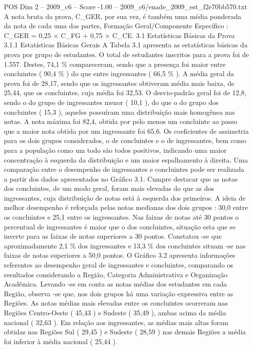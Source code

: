\begin{textsample}{POS Dim 2 – 2009\_c6 – Score -1.00 – 2009\_c6/enade\_2009\_est\_f2e70bb570.txt}
A nota bruta da prova, C\_GER, por sua vez, é também uma média ponderada da nota de cada uma das partes, Formação Geral/Componente Específico : C\_GER = 0,25 × C\_FG + 0,75 × C\_CE. 3.1 Estatísticas Básicas da Prova 3.1.1 Estatísticas Básicas Gerais A Tabela 3.1 apresenta as estatísticas básicas da prova por grupo de estudantes.
O total de estudantes inscritos para a prova foi de 1.557.
Destes, 74,1 \% compareceram, sendo que a presença foi maior entre concluintes ( 90,4 \% ) do que entre ingressantes ( 66,5 \% ).
A média geral da prova foi de 28,17, sendo que os ingressantes obtiveram média mais baixa, de 25,44, que os concluintes, cuja média foi 32,53.
O desvio-padrão geral foi de 12,8, sendo o do grupo de ingressantes menor ( 10,1 ), do que o do grupo dos concluintes ( 15,3 ), aqueles possuíram uma distribuição mais homogênea nas notas.
A nota máxima foi 82,4, obtida por pelo menos um concluinte ao passo que a maior nota obtida por um ingressante foi 65,6.
Os coeficientes de assimetria para os dois grupos considerados, o de concluintes e o de ingressantes, bem como para a população como um todo são todos positivos, indicando uma maior concentração à esquerda da distribuição e um maior espalhamento à direita.
Uma comparação entre o desempenho de ingressantes e concluintes pode ser realizada a partir dos dados apresentados no Gráfico 3.1.
Cumpre destacar que as notas dos concluintes, de um modo geral, foram mais elevadas do que as dos ingressantes, cuja distribuição de notas está à esquerda dos primeiros.
A ideia de melhor desempenho é reforçada pelas notas medianas dos dois grupos : 30,0 entre os concluintes e 25,1 entre os ingressantes.
Nas faixas de notas até 30 pontos o percentual de ingressantes é maior que o dos concluintes, situação esta que se inverte para as faixas de notas superiores a 30 pontos.
Constatou -se que aproximadamente 2,1 \% dos ingressantes e 13,3 \% dos concluintes situam -se nas faixas de notas superiores a 50,0 pontos.
O Gráfico 3.2 apresenta informações referentes ao desempenho geral de ingressantes e concluintes, comparando os resultados considerando a Região, Categoria Administrativa e Organização Acadêmica.
Levando -se em conta as notas médias dos estudantes em cada Região, observa -se que, nos dois grupos há uma variação expressiva entre as Regiões.
As notas médias mais elevadas entre os concluintes ocorreram nas Regiões Centro-Oeste ( 45,43 ) e Sudeste ( 35,49 ), ambas acima da média nacional ( 32,63 ).
Em relação aos ingressantes, as médias mais altas foram obtidas nas Regiões Sul ( 29,45 ) e Sudeste ( 28,59 ) nas demais Regiões a média foi inferior à média nacional ( 25,44 ).

\end{textsample}
